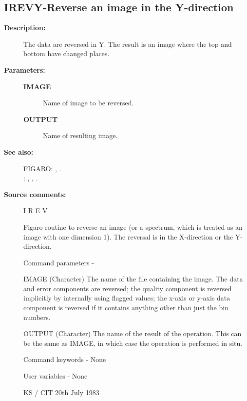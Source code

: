 \begin{description}
\subsection{IREVY-\label{IREVY}Reverse an image in the Y-direction}
\begin{description}

\item [\textbf{Description:}]
 The data are reversed in Y.  The result is an image where
 the top and bottom have changed places.

\item [\textbf{Parameters:}]
\begin{description}
\item [\textbf{IMAGE}]
 Name of image to be reversed.
\item [\textbf{OUTPUT}]
 Name of resulting image.
\end{description}

\item [\textbf{See also:}]
FIGARO: , .\\
: , , .\\

\item [\textbf{Source comments:}]
\begin{terminalv}
 I R E V

 Figaro routine to reverse an image (or a spectrum, which
 is treated as an image with one dimension 1).  The reversal
 is in the X-direction or the Y-direction.

 Command parameters -

 IMAGE    (Character) The name of the file containing the image.
          The data and error components are reversed; the quality
          component is reversed implicitly by internally using
          flagged values; the x-axis or y-axis data
          component is reversed if it contains anything other than
          just the bin numbers.

 OUTPUT   (Character) The name of the result of the operation.
          This can be the same as IMAGE, in which case the
          operation is performed in situ.

 Command keywords - None

 User variables - None

                                     KS / CIT 20th July 1983
\end{terminalv}
\end{description}

\end{description}
